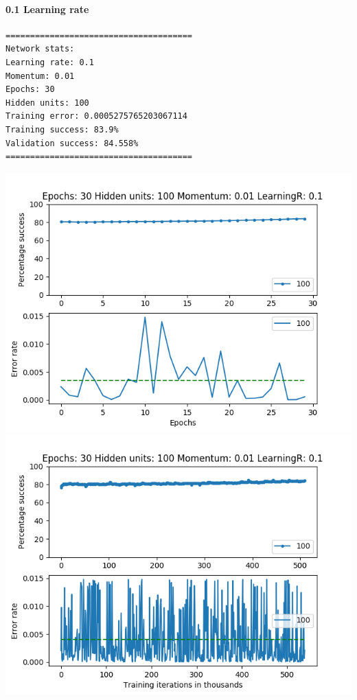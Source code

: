 \documentclass[11pt]{article}
\makeatletter
\def\maxwidth{\ifdim\Gin@nat@width>\linewidth\linewidth
    \else\Gin@nat@width\fi}
\let\Oldincludegraphics\includegraphics
\renewcommand{\includegraphics}[1]{\Oldincludegraphics[width=.8\maxwidth]{#1}}
\makeatother
\begin{document}
\hypertarget{learning-rate-1}{%
\paragraph{0.1 Learning rate}\label{learning-rate-1}}

\begin{verbatim}
======================================
Network stats: 
Learning rate: 0.1
Momentum: 0.01
Epochs: 30
Hidden units: 100
Training error: 0.0005275765203067114
Training success: 83.9%
Validation success: 84.558%
======================================
\end{verbatim}

\includegraphics{Experiment2/E2_NN_Epoch_Momentum_0.01_30Epochs_100_LR_0.1_Hiddenunits.png}
\includegraphics{Experiment2/E2_NN_Training_Momentum_0.01_30Epochs_100_LR_0.1_Hiddenunits.png}
\end{document}
